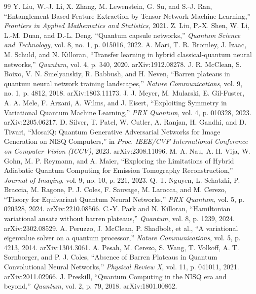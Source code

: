 \documentclass[11pt]{article}
\begin{document}
\begin{thebibliography}{99}
 Y. Liu, W.-J. Li, X. Zhang, M. Lewenstein, G. Su, and S.-J. Ran, ``Entanglement-Based Feature Extraction by Tensor Network Machine Learning,'' \textit{Frontiers in Applied Mathematics and Statistics}, 2021.
 Z. Liu, P.-X. Shen, W. Li, L.-M. Duan, and D.-L. Deng, ``Quantum capsule networks,'' \textit{Quantum Science and Technology}, vol. 8, no. 1, p. 015016, 2022.
 A. Mari, T. R. Bromley, J. Izaac, M. Schuld, and N. Killoran, ``Transfer learning in hybrid classical-quantum neural networks,'' \textit{Quantum}, vol. 4, p. 340, 2020. arXiv:1912.08278.
 J. R. McClean, S. Boixo, V. N. Smelyanskiy, R. Babbush, and H. Neven, ``Barren plateaus in quantum neural network training landscapes,'' \textit{Nature Communications}, vol. 9, no. 1, p. 4812, 2018. arXiv:1803.11173.
 J. J. Meyer, M. Mularski, E. Gil-Fuster, A. A. Mele, F. Arzani, A. Wilms, and J. Eisert, ``Exploiting Symmetry in Variational Quantum Machine Learning,'' \textit{PRX Quantum}, vol. 4, p. 010328, 2023. arXiv:2205.06217.
 D. Silver, T. Patel, W. Cutler, A. Ranjan, H. Gandhi, and D. Tiwari, ``MosaiQ: Quantum Generative Adversarial Networks for Image Generation on NISQ Computers,'' in \textit{Proc. IEEE/CVF International Conference on Computer Vision (ICCV)}, 2023. arXiv:2308.11096.
 M. A. Nau, A. H. Vija, W. Gohn, M. P. Reymann, and A. Maier, ``Exploring the Limitations of Hybrid Adiabatic Quantum Computing for Emission Tomography Reconstruction,'' \textit{Journal of Imaging}, vol. 9, no. 10, p. 221, 2023.
 Q. T. Nguyen, L. Schatzki, P. Braccia, M. Ragone, P. J. Coles, F. Sauvage, M. Larocca, and M. Cerezo, ``Theory for Equivariant Quantum Neural Networks,'' \textit{PRX Quantum}, vol. 5, p. 020328, 2024. arXiv:2210.08566.
 C.-Y. Park and N. Killoran, ``Hamiltonian variational ansatz without barren plateaus,'' \textit{Quantum}, vol. 8, p. 1239, 2024. arXiv:2302.08529.
 A. Peruzzo, J. McClean, P. Shadbolt, et al., ``A variational eigenvalue solver on a quantum processor,'' \textit{Nature Communications}, vol. 5, p. 4213, 2014. arXiv:1304.3061.
 A. Pesah, M. Cerezo, S. Wang, T. Volkoff, A. T. Sornborger, and P. J. Coles, ``Absence of Barren Plateaus in Quantum Convolutional Neural Networks,'' \textit{Physical Review X}, vol. 11, p. 041011, 2021. arXiv:2011.02966.
 J. Preskill, ``Quantum Computing in the NISQ era and beyond,'' \textit{Quantum}, vol. 2, p. 79, 2018. arXiv:1801.00862.

\end{thebibliography}
\end{document}
